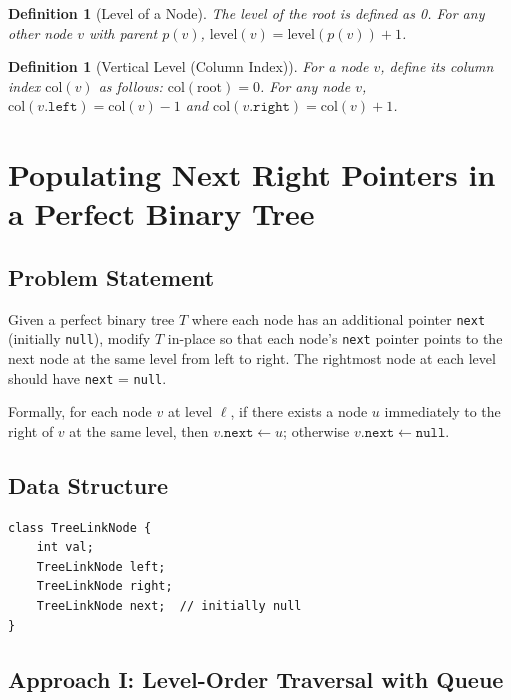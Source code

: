 \documentclass[10pt,journal,compsoc,onecolumn]{IEEEtran}
\newtheorem{definition}[theorem]{Definition}
\begin{document}
\begin{definition}[Level of a Node]
The level of the root is defined as 0. For any other node $v$ with parent $p(v)$, $\text{level}(v) = \text{level}(p(v)) + 1$.
\end{definition}

\begin{definition}[Vertical Level (Column Index)]
For a node $v$, define its \emph{column index} $\text{col}(v)$ as follows: $\text{col}(\text{root}) = 0$. For any node $v$, $\text{col}(v.\texttt{left}) = \text{col}(v) - 1$ and $\text{col}(v.\texttt{right}) = \text{col}(v) + 1$.
\end{definition}

\section{Populating Next Right Pointers in a Perfect Binary Tree}
\label{sec:next-pointer}

\subsection{Problem Statement}

Given a perfect binary tree $T$ where each node has an additional pointer \texttt{next} (initially \texttt{null}), modify $T$ in-place so that each node's \texttt{next} pointer points to the next node at the same level from left to right. The rightmost node at each level should have \texttt{next} = \texttt{null}.

Formally, for each node $v$ at level $\ell$, if there exists a node $u$ immediately to the right of $v$ at the same level, then $v.\texttt{next} \leftarrow u$; otherwise $v.\texttt{next} \leftarrow \texttt{null}$.

\subsection{Data Structure}

\begin{verbatim}
class TreeLinkNode {
    int val;
    TreeLinkNode left;
    TreeLinkNode right;
    TreeLinkNode next;  // initially null
}
\end{verbatim}

\subsection{Approach I: Level-Order Traversal with Queue}
\end{document}
